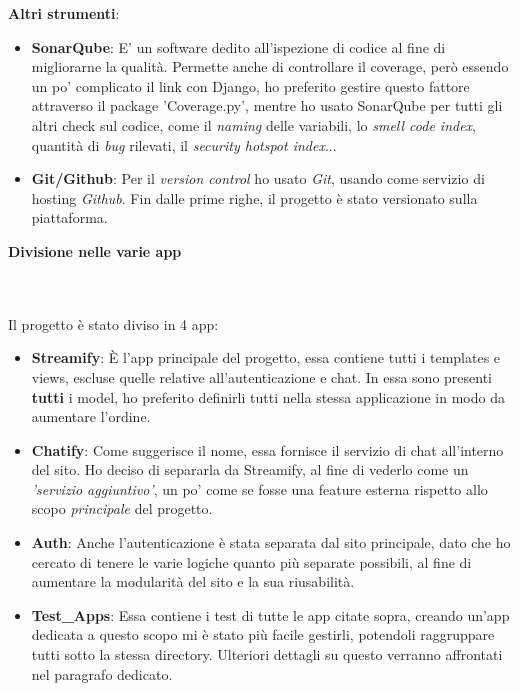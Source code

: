 \documentclass[12pt]{article}
\begin{document}
	\noindent \textbf{Altri strumenti}:
	\begin{itemize}
		\item \textbf{SonarQube}: E' un software dedito all'ispezione di codice al fine di migliorarne la qualità. Permette anche di controllare il coverage, però essendo un po' complicato il link con Django, ho preferito gestire questo fattore attraverso il package 'Coverage.py', mentre ho usato SonarQube per tutti gli altri check sul codice, come il \textit{naming} delle variabili, lo \textit{smell code index}, quantità di \textit{bug} rilevati, il \textit{security hotspot index}...
		
		\item \textbf{Git/Github}: Per il \textit{version control} ho usato \textit{Git}, usando come servizio di hosting \textit{Github}. Fin dalle prime righe, il progetto è stato versionato sulla piattaforma.
	\end{itemize}
	\pagebreak

	
	\noindent \centerline {\Huge \textbf{Divisione nelle varie app}} \\ \\ 
	Il progetto è stato diviso in 4 app:
	
	\begin{itemize}
		\item \textbf{Streamify}: È l'app principale del progetto, essa contiene tutti i templates e views, escluse quelle relative all'autenticazione e chat. In essa sono presenti \textbf{tutti} i model, ho preferito definirli tutti nella stessa applicazione in modo da aumentare l'ordine. \\
		
		\item \textbf{Chatify}: Come suggerisce il nome, essa fornisce il servizio di chat all'interno del sito. Ho deciso di separarla da Streamify, al fine di vederlo come un \textit{'servizio aggiuntivo'}, un po' come se fosse una feature esterna rispetto allo scopo \textit{principale} del progetto. \\
		
		\item \textbf{Auth}: Anche l'autenticazione è stata separata dal sito principale, dato che ho cercato di tenere le varie logiche quanto più separate possibili, al fine di aumentare la modularità del sito e la sua riusabilità. \\
		
		\item \textbf{Test\_Apps}: Essa contiene i test di tutte le app citate sopra, creando un'app dedicata a questo scopo mi è stato più facile gestirli, potendoli raggruppare tutti sotto la stessa directory. Ulteriori dettagli su questo verranno affrontati nel paragrafo dedicato. \\
	\end{itemize}
	\pagebreak
	
\end{document}
